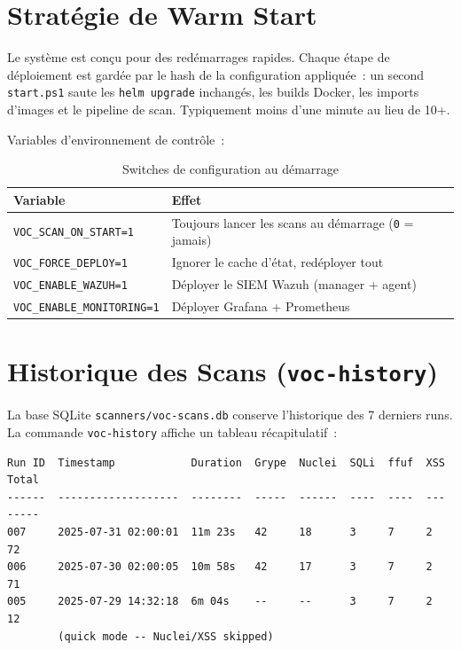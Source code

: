 \documentclass[12pt,a4paper]{report}
\begin{document}
\section{Stratégie de Warm Start}
Le système est conçu pour des redémarrages rapides. Chaque étape de déploiement est gardée par le hash de la configuration appliquée~: un second \texttt{start.ps1} saute les \texttt{helm upgrade} inchangés, les builds Docker, les imports d'images et le pipeline de scan. Typiquement moins d'une minute au lieu de 10+.

Variables d'environnement de contrôle~:

\begin{table}[H]
\centering
\caption{Switches de configuration au démarrage}
\small
\begin{tabularx}{\textwidth}{L{4.2cm} X}
\toprule
\textbf{Variable} & \textbf{Effet} \\
\midrule
\texttt{VOC\_SCAN\_ON\_START=1}    & Toujours lancer les scans au démarrage (\texttt{0} = jamais) \\
\texttt{VOC\_FORCE\_DEPLOY=1}      & Ignorer le cache d'état, redéployer tout \\
\texttt{VOC\_ENABLE\_WAZUH=1}      & Déployer le SIEM Wazuh (manager + agent) \\
\texttt{VOC\_ENABLE\_MONITORING=1} & Déployer Grafana + Prometheus \\
\bottomrule
\end{tabularx}
\end{table}

\section{Historique des Scans (\texttt{voc-history})}
La base SQLite \texttt{scanners/voc-scans.db} conserve l'historique des 7 derniers runs. La commande \texttt{voc-history} affiche un tableau récapitulatif~:

\begin{lstlisting}[caption={Exemple de sortie voc-history}, label={lst:voc_history}]
Run ID  Timestamp            Duration  Grype  Nuclei  SQLi  ffuf  XSS  Total
------  -------------------  --------  -----  ------  ----  ----  ---  -----
007     2025-07-31 02:00:01  11m 23s   42     18      3     7     2    72
006     2025-07-30 02:00:05  10m 58s   42     17      3     7     2    71
005     2025-07-29 14:32:18  6m 04s    --     --      3     7     2    12
        (quick mode -- Nuclei/XSS skipped)
\end{lstlisting}
\end{document}
